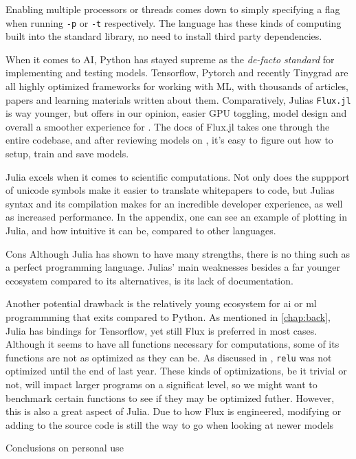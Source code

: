 Enabling multiple processors or threads comes down to simply specifying a flag when running \texttt{-p} or \texttt{-t} respectively. The language has these kinds of computing built into the standard library, no need to install third party dependencies. 

When it comes to AI, Python has stayed supreme as the \textit{de-facto standard} for implementing and testing models. Tensorflow, Pytorch and recently Tinygrad are all highly optimized frameworks for working with ML, with thousands of articles, papers and learning materials written about them. Comparatively, Julias \texttt{Flux.jl} is way younger, but offers in our opinion, easier GPU toggling, model design and overall a smoother experience for . The docs of Flux.jl takes one through the entire codebase, and after reviewing models on \cite{https://github.com/FluxML/model-zoo}, it's easy to figure out how to setup, train and save models.

Julia excels when it comes to scientific computations. Not only does the suppport of unicode symbols make it easier to translate whitepapers to code, but Julias syntax and its compilation makes for an incredible developer experience, as well as increased performance. In the appendix, one can see an example of plotting in Julia, and how intuitive it can be, compared to other languages.






Cons
Although Julia has shown to have many strengths, there is no thing such as a perfect programming language. Julias' main weaknesses besides a far younger ecosystem compared to its alternatives, is its lack of documentation. 

Another potential drawback is the relatively young ecosystem for \acrshort{ai} or \acrshort{ml} programmming that exits compared to Python. As mentioned in \ref{chap:back}, Julia has bindings for Tensorflow, yet still Flux is preferred in most cases. Although it seems to have all functions necessary for computations, some of its functions are not as optimized as they can be. As discussed in \cite{projthesis}, \lstinline|relu| was not optimized until the end of last year. These kinds of optimizations, be it trivial or not, will impact larger programs on a significat level, so we might want to benchmark certain functions to see if they may be optimized futher. However, this is also a great aspect of Julia. Due to how Flux is engineered, modifying or adding to the source code is still the way to go when looking at newer models


Conclusions on personal use 
